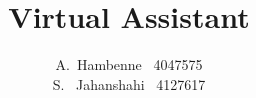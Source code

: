 \documentclass{tudelft-report}
\begin{document}
\frontmatter

\title[Bachelor Thesis - 2015]{Virtual Assistant}
\author{A.\ Hambenne \ 4047575 \\
S. \ Jahanshahi \ 4127617}
\makecover





\tableofcontents

\mainmatter
	

	
% 	
% 	
% 
% 
% 	
% 	







	



	




\appendix

%


\end{document}
